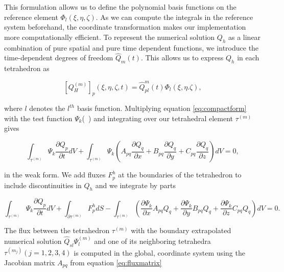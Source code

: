 This formulation allows us to define the polynomial basis functions on the reference element $\Phi_l\left(\xi, \eta, \zeta\right)$.
As we can compute the integrals in the reference system beforehand, the coordinate transformation makes our implementation more computationally
efficient. To represent the numerical solution $Q_h$ as a linear combination of pure spatial and pure time dependent functions, we introduce
the time-dependent degrees of freedom $\hat{Q}_m\left(t\right)$. This allows us to express $Q_h$ in each tetrahedron as 

\begin{equation}
    \left[Q_H^{\left(m\right)}\right]_p \left(\xi, \eta, \zeta, t\right) = \hat{Q}_{pl}^m \left(t\right) \Phi_l \left(\xi, \eta. \zeta\right),
\label{eq:solution}
\end{equation}

where $l$ denotes the $l^{th}$ basis function. Multiplying equation \ref{eq:compactform} with the test function $\Psi_k$(~\parencite{cockburn2011discontinuous})
and integrating over our tetrahedral element $\tau^{\left(m\right)}$ gives

\begin{equation}
    \int_{\tau^{\left(m\right)}} \Psi_k \frac{\partial Q_p}{\partial t} dV + \int_{\tau^{\left(m\right)}} \Psi_k \left(A_{pq} 
    \frac{\partial Q_q}{\partial x} + B_{pq}\frac{\partial Q_q}{\partial y} + C_{pq}\frac{\partial Q_q}{\partial z}\right)dV = 0,
\end{equation}

in the weak form. We add fluxes $F_p^h$ at the boundaries of the tetrahedron to include discontinuities in $Q_h$ and we integrate by parts 

\begin{equation}
    \int_{\tau^{\left(m\right)}} \Psi_k \frac{\partial Q_p}{\partial t} dV + \int_{\partial \tau^{\left(m\right)}} F_p^h dS
    - \int_{\tau^{\left(m\right)}} \left(\frac{\partial \Psi_k}{\partial x} A_{pq}Q_q + \frac{\partial \Psi_k}{\partial y}B_{pq}Q_q
    + \frac{\partial \Psi_k}{\partial z}C_{pq}Q_q\right) dV = 0.
\label{eq:weakformulation}
\end{equation}

The flux between the tetrahedron $\tau^{\left(m\right)}$ with the boundary extrapolated numerical solution $\hat{Q}_{sl} \Psi_l^{\left(m\right)}$
and one of its neighboring tetrahedra $\tau^{\left(m_j\right)} \left(j=1,2,3,4\right)$ is computed in the global, coordinate system using the Jacobian
matrix $A_{pq}$ from equation \ref{eq:fluxmatrix}

